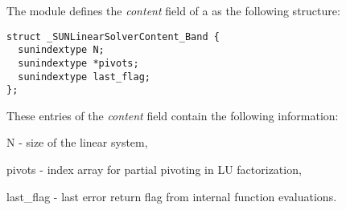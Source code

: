 The {\sunlinsollapband} module defines the \textit{content} field of a
 as the following structure:
\begin{verbatim}
struct _SUNLinearSolverContent_Band {
  sunindextype N;
  sunindextype *pivots;
  sunindextype last_flag;
};
\end{verbatim}
These entries of the \emph{content} field contain the following
information:
\begin{args}
  \item[N] - size of the linear system,
  \item[pivots] - index array for partial pivoting in LU factorization,
  \item[last\_flag] - last error return flag from internal function evaluations.
\end{args}

